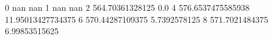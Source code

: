 0 nan nan
1 nan nan
2 564.70361328125 0.0
4 576.6537475585938 11.95013427734375
6 570.44287109375 5.7392578125
8 571.7021484375 6.99853515625
